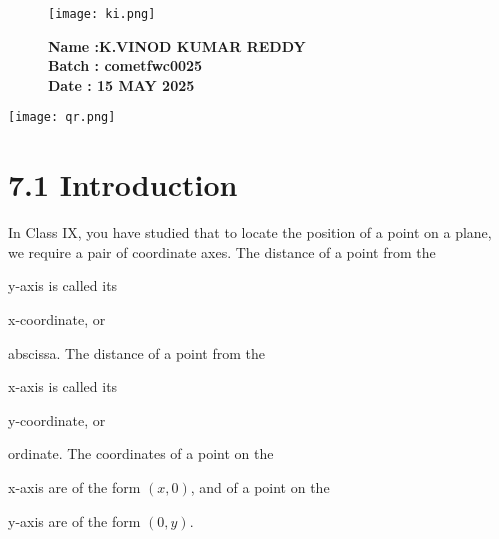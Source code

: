 \documentclass[a4paper,12pt]{article}
\begin{document}
\begin{figure}[h!]
    \centering
    \begin{minipage}{0.45\textwidth}
        \texttt{[image: ki.png]} %
    \end{minipage}
    \hfill
    \begin{minipage}{0.45\textwidth}
        \textbf{Name :K.VINOD KUMAR REDDY} \\%
        \textbf{Batch : cometfwc0025} \\%
        \textbf{Date : 15 MAY 2025}%
    \end{minipage}
\end{figure}

\begin{center}
    \texttt{[image: qr.png]} %
\end{center}

\begin{center}
\end{center}

\vspace{0.6cm}

\section*{\textcolor{cyan!80!blue}{7.1 Introduction}}

In Class IX, you have studied that to locate the position of a point on a plane, we require a pair of coordinate axes. The distance of a point from the \item{y}-axis is called its \item{x-coordinate}, or \item{abscissa}. The distance of a point from the \item{x}-axis is called its \item{y-coordinate}, or \item{ordinate}. The coordinates of a point on the \item{x}-axis are of the form $(x, 0)$, and of a point on the \item{y}-axis are of the form $(0, y)$.
\end{document}

